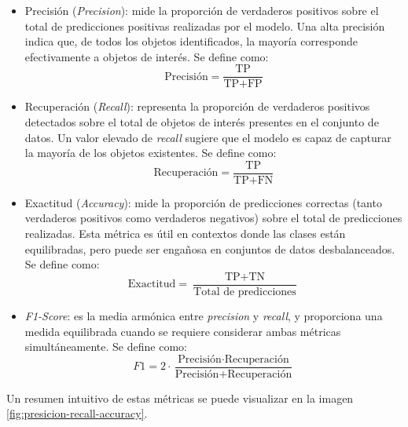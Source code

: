 \begin{itemize}
	\item Precisión (\textit{Precision}): mide la proporción de verdaderos positivos sobre el total de predicciones positivas realizadas por el modelo. Una alta precisión indica que, de todos los objetos identificados, la mayoría corresponde efectivamente a objetos de interés. Se define como:
	      \begin{equation}
		      \text{Precisión} = \frac{\text{TP}}{\text{TP} + \text{FP}}
		      \label{eq:precision}
	      \end{equation}
	\item Recuperación (\textit{Recall}): representa la proporción de verdaderos positivos detectados sobre el total de objetos de interés presentes en el conjunto de datos. Un valor elevado de \textit{recall} sugiere que el modelo es capaz de capturar la mayoría de los objetos existentes. Se define como:
	      \begin{equation}
		      \text{Recuperación} = \frac{\text{TP}}{\text{TP} + \text{FN}}
		      \label{eq:recuperacion}
	      \end{equation}
	\item Exactitud (\textit{Accuracy}): mide la proporción de predicciones correctas (tanto verdaderos positivos como verdaderos negativos) sobre el total de predicciones realizadas. Esta métrica es útil en contextos donde las clases están equilibradas, pero puede ser engañosa en conjuntos de datos desbalanceados. Se define como:
	      \begin{equation}
		      \text{Exactitud} = \frac{\text{TP} + \text{TN}}{\text{Total de predicciones}}
		      \label{eq:exactitud}
	      \end{equation}
	\item \textit{F1-Score}: es la media armónica entre \textit{precision} y \textit{recall}, y proporciona una medida equilibrada cuando se requiere considerar ambas métricas simultáneamente. Se define como:
	      \begin{equation}
		      F1 = 2 \cdot \frac{\text{Precisión} \cdot \text{Recuperación}}{\text{Precisión} + \text{Recuperación}}
		      \label{eq:f1}
	      \end{equation}
\end{itemize}

Un resumen intuitivo de estas métricas se puede visualizar en la imagen \ref{fig:presicion-recall-accuracy}.

